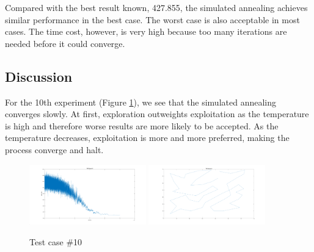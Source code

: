 \documentclass{IEEEtran}
\begin{document}
{{        Compared with the best result known, 427.855, the simulated annealing achieves similar performance in the best case.
        The worst case is also acceptable in most cases. 
        The time cost, however, is very high because too many iterations are needed before it could converge.
    }

    \subsection{Discussion}
    {
        For the 10th experiment (Figure \ref{fig:TSP_SA_example}), we see that the simulated annealing converges slowly. 
        At first, exploration outweights exploitation as the temperature is high and therefore worse results are more likely to be accepted.
        As the temperature decreases, exploitation is more and more preferred, making the process converge and halt.

        \begin{figure}[!htbp]
            \centering
            \includegraphics[width=0.45\textwidth]{Q2/figures/TSP_SA_test_result_10.png}
            \includegraphics[width=0.45\textwidth]{Q2/figures/TSP_SA_test_10.png}
            \caption{Test case \#10}
            \label{fig:TSP_SA_example}
        \end{figure}
    }
}



\end{document}
